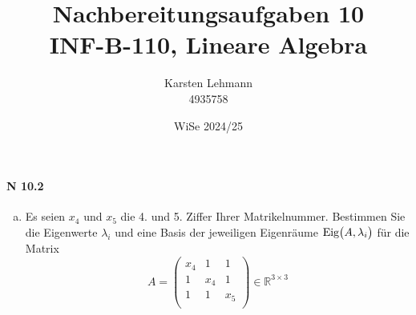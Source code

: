 \documentclass{scrreprt}
\author{Karsten Lehmann \\ 4935758}
\date{WiSe 2024/25}
\title{Nachbereitungsaufgaben 10\\INF-B-110, Lineare Algebra}
\begin{document}
\paragraph{N 10.2}
\begin{enumerate}[(a)]
\item Es seien $x_4$ und $x_5$ die 4. und 5. Ziffer Ihrer Matrikelnummer.
  Bestimmen Sie die Eigenwerte $\lambda_i$ und eine Basis der jeweiligen
  Eigenräume $\text{Eig}\qty\big(A, \lambda_i)$ für die Matrix
  \[
    A = \begin{pmatrix}
      x_4 & 1   & 1   \\
      1   & x_4 & 1   \\
      1   & 1   & x_5 \\
    \end{pmatrix} \in \mathbb{R}^{3 \times 3}
  \]


\end{enumerate}
\end{document}
